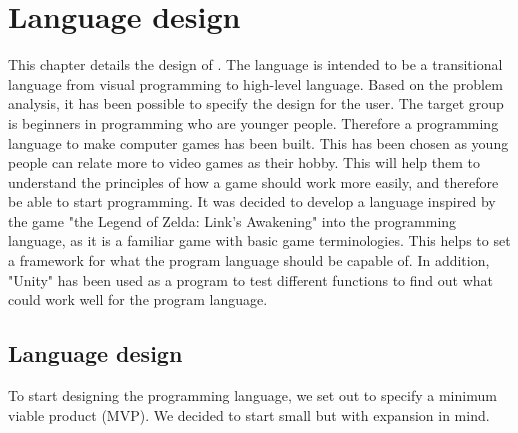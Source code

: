 \chapter{Language design}\label{chap:language_design}
This chapter details the design of \dazel.
The language is intended to be a transitional language from visual programming to high-level language. Based on the problem analysis, it has been possible to specify the design for the user.
The target group is beginners in programming who are younger people. Therefore a programming language to make computer games has been built. This has been chosen as young people can relate more to video games as their hobby. 
This will help them to understand the principles of how a game should work more easily, and therefore be able to start programming. 
It was decided to develop a language inspired by the game "the Legend of Zelda: Link’s Awakening" into the programming language, as it is a familiar game with basic game terminologies.
This helps to set a framework for what the program language should be capable of.
In addition, "Unity" has been used as a program to test different functions to find out what could work well for the program language.



\section{Language design}

To start designing the programming language, we set out to specify a minimum viable product (MVP). We decided to start small but with expansion in mind.











